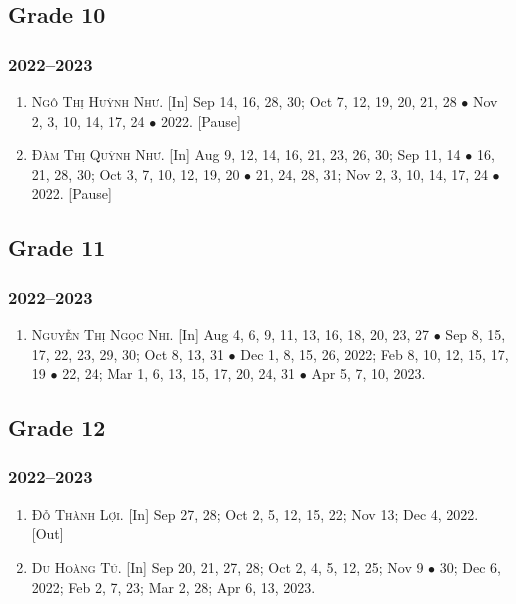 \documentclass{article}
\begin{document}
\subsection{Grade 10}

\subsubsection{2022--2023}

\begin{enumerate}
	\item \textsc{Ngô Thị Huỳnh Như.} \textsf{[In]} Sep 14, 16, 28, 30; Oct 7, 12, 19, 20, 21, 28 $\bullet$ Nov 2, 3, 10, 14, 17, 24 $\bullet$ 2022. \textsf{[Pause]}
	\item \textsc{Đàm Thị Quỳnh Như.} \textsf{[In]} Aug 9, 12, 14, 16, 21, 23, 26, 30; Sep 11, 14 $\bullet$ 16, 21, 28, 30; Oct 3, 7, 10, 12, 19, 20 $\bullet$ 21, 24, 28, 31; Nov 2, 3, 10, 14, 17, 24 $\bullet$ 2022. \textsf{[Pause]}
\end{enumerate}

\subsection{Grade 11}

\subsubsection{2022--2023}

\begin{enumerate}
	\item \textsc{Nguyễn Thị Ngọc Nhi.} \textsf{[In]} Aug 4, 6, 9, 11, 13, 16, 18, 20, 23, 27 $\bullet$ Sep 8, 15, 17, 22, 23, 29, 30; Oct 8, 13, 31 $\bullet$ Dec 1, 8,  15, 26, 2022; Feb 8, 10, 12, 15, 17, 19 $\bullet$ 22, 24; Mar 1, 6, 13, 15, 17, 20, 24, 31 $\bullet$ Apr 5, 7, 10, 2023.
\end{enumerate}

\subsection{Grade 12}

\subsubsection{2022--2023}

\begin{enumerate}
	\item \textsc{Đỗ Thành Lợi.} \textsf{[In]} Sep 27, 28; Oct 2, 5, 12, 15, 22; Nov 13; Dec 4, 2022. \textsf{[Out]}
	\item \textsc{Du Hoàng Tú.} \textsf{[In]} Sep 20, 21, 27, 28; Oct 2, 4, 5, 12, 25; Nov 9 $\bullet$ 30; Dec 6, 2022; Feb 2, 7, 23; Mar 2, 28; Apr 6, 13, 2023.
\end{enumerate}
\end{document}
